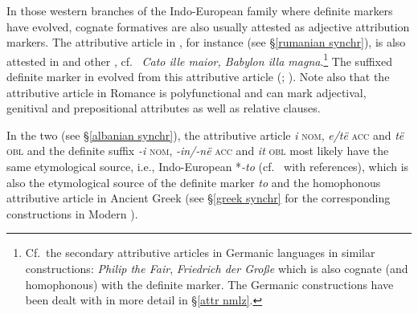 {In those western branches of the Indo-European family where definite markers have evolved, cognate formatives are also usually attested as adjective attribution markers. The attributive article in , for instance (see \S\ref{rumanian synchr}), is also attested in  and other , cf.~ \textit{Cato ille maior, Babylon illa magna}.\footnote{Cf.~the secondary attributive articles in Germanic languages in similar constructions:  \textit{Philip the Fair},  \textit{Friedrich der Große} which is also cognate (and homophonous) with the definite marker. The Germanic constructions have been dealt with in more detail in \S\ref{attr nmlz}.} The suffixed definite marker in  evolved from this attributive article (\citealt{gamillscheg1937}; \citealt[5]{nocentini1996}). Note also that the attributive article in Romance is polyfunctional and can mark adjectival, genitival and prepositional attributes as well as relative clauses.

In the two  (see \S\ref{albanian synchr}), the attributive article \textit{i} \textsc{nom}, \textit{e/të} \textsc{acc} and \textit{të} \textsc{obl} and the definite suffix \textit{-i} \textsc{nom}, \textit{-in/-në} \textsc{acc} and \textit{it} \textsc{obl} most likely have the same etymological source, i.e., Indo-European *\textit{-to} (cf.~\citet[165]{himmelmann1997} with references), which is also the etymological source of the definite marker \textit{to} and the homophonous attributive article in Ancient Greek (see \S\ref{greek synchr} for the corresponding constructions in Modern ).

}
